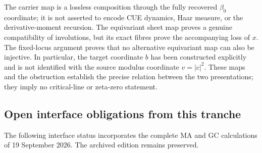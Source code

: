 \begin{remark}
The carrier map is a lossless composition through the fully recovered
$\beta_0$ coordinate; it is not asserted to encode CUE dynamics, Haar measure,
or the derivative-moment recursion.  The equivariant sheet map proves a genuine
compatibility of involutions, but its exact fibres prove the accompanying loss
of $x$.  The fixed-locus argument proves that no alternative equivariant map can
also be injective.  In particular, the target coordinate $b$ has been constructed
explicitly and is not identified with the source modulus coordinate $v=|c|^2$.
These maps and the obstruction establish the precise relation between the two
presentations; they imply no critical-line or zeta-zero statement.
\end{remark}












\subsection{Open interface obligations from this tranche}

The following interface status incorporates the complete MA and GC calculations of 19 September 2026. The archived edition remains preserved.

